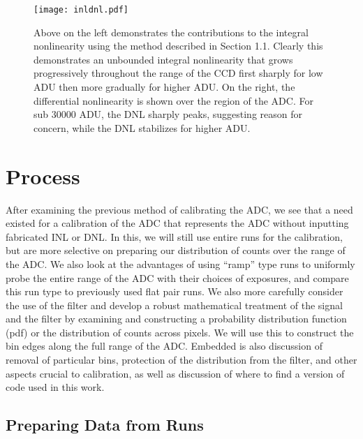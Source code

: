 \documentclass[11pt, letterpaper]{article}
\begin{document}
\begin{figure}
	\texttt{[image: inldnl.pdf]}
	\caption{Above on the left demonstrates the contributions to the integral nonlinearity using the method described in Section 1.1. Clearly this demonstrates an unbounded integral nonlinearity that grows progressively throughout the range of the CCD first sharply for low ADU then more gradually for higher ADU. On the right, the differential nonlinearity is shown over the region of the ADC. For sub 30000 ADU, the DNL sharply peaks, suggesting reason for concern, while the DNL stabilizes for higher ADU.}
\end{figure}

\section{Process}
\indent


After examining the previous method of calibrating the ADC, we see that a need existed for a calibration of the ADC that represents the ADC without inputting fabricated INL or DNL. 
In this, we will still use entire runs for the calibration, but are more selective on preparing our distribution of counts over the range of the ADC.
We also look at the advantages of using “ramp” type runs to uniformly probe the entire range of the ADC with their choices of exposures, and compare this run type to previously used flat pair runs.
We also more carefully consider the use of the filter and develop a robust mathematical treatment of the signal and the filter by examining and constructing a probability distribution function (pdf) or the distribution of counts across pixels.  
We will use this to construct the bin edges along the full range of the ADC. 
Embedded is also discussion of removal of particular bins, protection of the distribution from the filter, and other aspects crucial to calibration, as well as discussion of where to find a version of code used in this work.

\subsection{Preparing Data from Runs}
\indent
\end{document}
